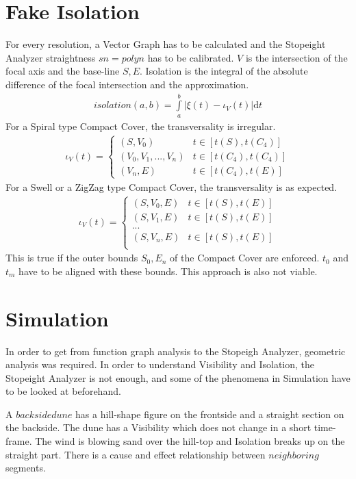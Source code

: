\documentclass{report}
\begin{document}
\section{Fake Isolation}
For every resolution, a Vector Graph has to be calculated and the Stopeight Analyzer straightness $sn=polyn$ has to be calibrated. $V$ is the intersection of the focal axis and the base-line $S,E$.
Isolation is the integral of the absolute difference of the focal intersection and the approximation.
\begin{align}
isolation(a,b)= \int \limits _{a}^{b} \vert \xi(t)-\iota_{V}(t)\vert  \mathrm{d}t
\end{align}
For a Spiral type Compact Cover, the transversality is irregular.
\begin{align*}
\iota_{V}(t) =
\begin{cases}
(S,V_{0}) & t \in [t(S),t(C_{4})]\\
(V_{0},V_{1}, ... , V_{n}) & t \in [t(C_{4}),t(C_{4})]\\
(V_{n},E) & t \in [t(C_{4}),t(E)]
\end{cases}
\end{align*}
For a Swell or a ZigZag type Compact Cover, the transversality is as expected.
\begin{align*}
\iota_{V}(t) =
\begin{cases}
(S,V_{0},E) & t \in [t(S),t(E)]\\
(S,V_{1},E) & t \in [t(S),t(E)]\\
...\\
(S,V_{n},E) & t \in [t(S),t(E)]\\
\end{cases}
\end{align*}
This is true if the outer bounds $S_{0},E_{n}$ of the Compact Cover are enforced. $t_{0}$ and $t_{m}$ have to be aligned with these bounds.
This approach is also not viable.

\section{Simulation}
In order to get from function graph analysis to the Stopeigh Analyzer, geometric analysis was required. In order to understand Visibility and Isolation, the Stopeight Analyzer is not enough, and some of the phenomena in Simulation have to be looked at beforehand.

A $backside dune$ has a hill-shape figure on the frontside and a straight section on the backside. The dune has a Visibility which does not change in a short time-frame. The wind is blowing sand over the hill-top and Isolation breaks up on the straight part. There is a cause and effect relationship between $neighboring$ segments.
\end{document}
